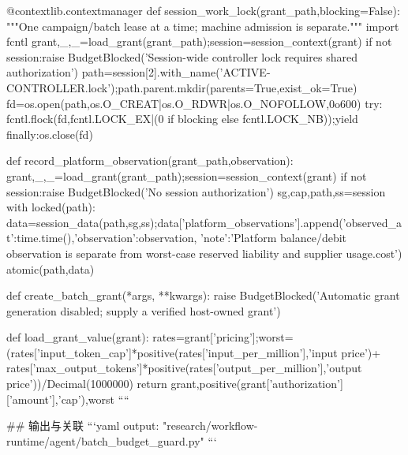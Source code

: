 @contextlib.contextmanager
def session_work_lock(grant_path,blocking=False):
    """One campaign/batch lease at a time; machine admission is separate."""
    import fcntl
    grant,_,_=load_grant(grant_path);session=session_context(grant)
    if not session:raise BudgetBlocked('Session-wide controller lock requires shared authorization')
    path=session[2].with_name('ACTIVE-CONTROLLER.lock');path.parent.mkdir(parents=True,exist_ok=True)
    fd=os.open(path,os.O_CREAT|os.O_RDWR|os.O_NOFOLLOW,0o600)
    try:
        fcntl.flock(fd,fcntl.LOCK_EX|(0 if blocking else fcntl.LOCK_NB));yield
    finally:os.close(fd)

def record_platform_observation(grant_path,observation):
    grant,_,_=load_grant(grant_path);session=session_context(grant)
    if not session:raise BudgetBlocked('No session authorization')
    sg,cap,path,ss=session
    with locked(path):
        data=session_data(path,sg,ss);data['platform_observations'].append({'observed_at':time.time(),'observation':observation,
            'note':'Platform balance/debit observation is separate from worst-case reserved liability and supplier usage.cost'})
        atomic(path,data)

def create_batch_grant(*args, **kwargs):
    raise BudgetBlocked('Automatic grant generation disabled; supply a verified host-owned grant')

def load_grant_value(grant):
    rates=grant['pricing'];worst=(rates['input_token_cap']*positive(rates['input_per_million'],'input price')+
        rates['max_output_tokens']*positive(rates['output_per_million'],'output price'))/Decimal(1000000)
    return grant,positive(grant['authorization']['amount'],'cap'),worst
````

## 输出与关联
```yaml
output: "research/workflow-runtime/agent/batch_budget_guard.py"
```
